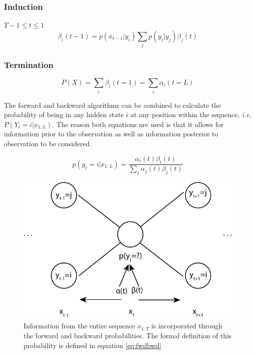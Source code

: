 \subsubsection{Induction}
$T-1\leq t\leq 1$
\begin{equation}
\beta_i(t-1) =p(x_{t-1}|y_i)\sum_{j}{p(y_i|y_j)\beta_j(t)}
\label{eq:bwdinduc}
\end{equation}

\subsubsection{Termination}
\begin{equation}
    P(X)= \sum_i{\beta_i(t=1)} = \sum_i{\alpha_i(t=L)}
\label{eq:bwdterm}
\end{equation}

The forward and backward algorithms can be combined to calculate the probability of being in any hidden state $i$ at any position within the sequence, \emph{i.e.} $P(Y_t=i|x_{1:L})$. The reason both equations are used is that it allows for information prior to the observation as well as information posterior to observation to be considered. 

\begin{equation}
p(y_t=i|x_{1:L}) = \frac{\alpha_i(t)\beta_i(t)}{\sum_j{\alpha_j(t)\beta_j(t)}}
\label{eq:fwdbwd}
\end{equation}

\begin{figure}[t]
\centering
\includegraphics[width=\textwidth]{images/fwdbwd.pdf}
\caption{Information from the entire sequence $x_{1:T}$ is incorporated through the forward and backward probabilities. The formal definition of this probability is defined in equation \ref{eq:fwdbwd}}
\label{fig:fwdbwd}
\end{figure}


